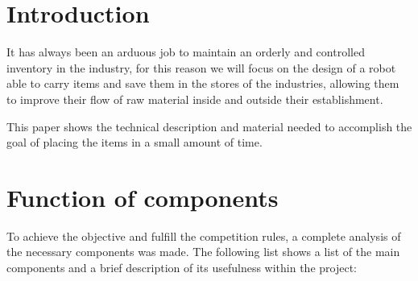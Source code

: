 \documentclass[preprint,12pt,3p]{elsarticle}
\begin{document}
%

\section{Introduction}
\label{sec1}

It has always been an arduous job to maintain an orderly and controlled inventory in the industry, for this reason we will focus on the design of a robot able to carry items and save them in the stores of the industries, allowing them to improve their flow of raw material inside and outside their establishment.

This paper shows the technical description and material needed to accomplish the goal of placing the items in a small amount of time.







\section{Function of components}

To achieve the objective and fulfill the competition rules, a complete analysis of the necessary components was made. The following list shows a list of the main components and a brief description of its usefulness within the project:
\end{document}
